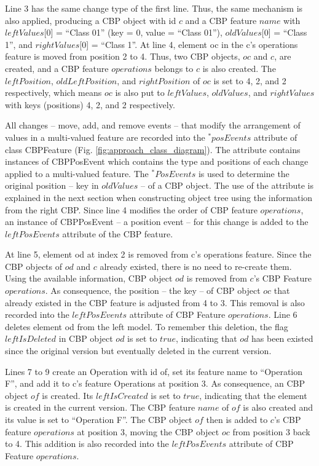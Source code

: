 \documentclass{llncs}
\begin{document}
Line 3 has the same change type of the first line. Thus, the same mechanism is also applied, producing a CBP object with id $c$ and a CBP feature $name$ with $leftValues$[0] = ``Class 01'' (key = 0, value = ``Class 01''), $oldValues$[0] = ``Class 1'', and $rightValues$[0] = ``Class 1''. At line 4, element \textsf{oc} in the \textsf{c}'s \textsf{operations} feature is moved from position 2 to 4. Thus, two CBP objects, $oc$ and $c$, are created, and a CBP feature $operations$ belongs to $c$ is also created. The $leftPosition$, $oldLeftPosition$, and $rightPosition$ of $oc$ is set to 4, 2, and 2 respectively, which means $oc$ is also put to $leftValues$, $oldValues$, and $rightValues$ with keys (positions) 4, 2, and 2 respectively. 

All changes -- move, add, and remove events -- that modify the arrangement of values in a multi-valued feature are recorded into the $^*posEvents$ attribute of class \textsf{CBPFeature} (Fig. \ref{fig:approach_class_diagram}). The attribute contains instances of \textsf{CBPPosEvent} which contains the type and positions of each change applied to a multi-valued feature. The $^*PosEvents$ is used to determine the original position -- key in $oldValues$ -- of a CBP object. The use of the attribute is explained in the next section when constructing object tree using the information from the right CBP. Since line 4 modifies the order of CBP feature $operations$, an instance of \textsf{CBPPosEvent} -- a position event -- for this change is added to the $leftPosEvents$ attribute of the CBP feature.        



At line 5, element \textsf{od} at index 2 is removed from \textsf{c}'s \textsf{operations} feature. Since the CBP objects of $od$ and $c$ already existed, there is no need to re-create them. Using the available information, CBP object $od$ is removed from $c$'s CBP Feature $operations$. As consequence, the position -- the key -- of CBP object $oc$ that already existed in the CBP feature is adjusted from 4 to 3. This removal is also recorded into the $leftPosEvents$ attribute of CBP Feature $operations$. Line 6 deletes element \textsf{od} from the left model. To remember this deletion, the flag $leftIsDeleted$ in CBP object $od$ is set to $true$, indicating that $od$ has been existed since the original version but eventually deleted in the current version. 

Lines 7 to 9 create an \textsf{Operation} with id \textsf{of}, set its feature \textsf{name} to ``Operation F'', and add it to \textsf{c}'s feature \textsf{Operations} at position 3. As consequence, an CBP object $of$ is created. Its $leftIsCreated$ is set to $true$, indicating that the element is created in the current version. The CBP feature $name$ of $of$ is also created and its value is set to ``Operation F''. The CBP object $of$ then is added to $c$'s CBP feature $operations$ at position 3, moving the CBP object $oc$ from position 3 back to 4. This addition is also recorded into the $leftPosEvents$ attribute of CBP Feature $operations$.
\end{document}
